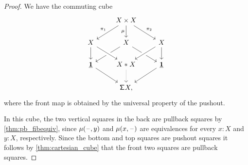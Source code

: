 \begin{proof}
We have the commuting cube
\begin{equation*}
\begin{tikzcd}
& X \times X \arrow[dl,swap,"\pi_1"] \arrow[d,swap,"\mu"] \arrow[dr,"\pi_2"] \\
X \arrow[d] & X \arrow[dl] \arrow[dr] & X \arrow[dl,crossing over] \arrow[d] \\
\unit \arrow[dr] & \join{X}{X} \arrow[from=ul,crossing over] \arrow[d,densely dotted] & \unit \arrow[dl] \\
& \susp X,
\end{tikzcd}
\end{equation*}
where the front map is obtained by the universal property of the pushout.

In this cube, the two vertical squares in the back are pullback squares by \cref{thm:pb_fibequiv}, since $\mu(\mathord{\hspace{1pt}\text{--}\hspace{1pt}},y)$ and $\mu(x,\mathord{\hspace{1pt}\text{--}\hspace{1pt}})$ are equivalences for every $x:X$ and $y:X$, respectively. Since the bottom and top squares are pushout squares it follows by \cref{thm:cartesian_cube} that the front two squares are pullback squares.
\end{proof}
